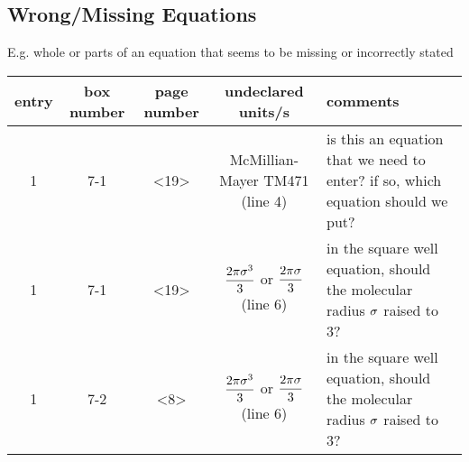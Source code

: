 \subsection{Wrong/Missing Equations}

E.g. whole or parts of an equation that seems to be missing or incorrectly stated \\ 

\begin{longtable} { | c | c | c | c | p{6cm} | } 
 \hline
    entry & box number & page number
    & undeclared units/s 
    & comments \\
 \hline
	1 & 7-1 & <19> & McMillian-Mayer TM471 (line 4) & is this an equation that we need to enter? if so, which equation should we put?  \\ \hline
	1 & 7-1 & <19> & $\dfrac{2\pie\molecrad^3}{3}$ or $\dfrac{2\pie\molecrad}{3}$ (line 6)& in the square well equation, should the molecular radius $\molecrad$ raised to 3? \\ \hline
    1 & 7-2 & <8> & $\dfrac{2\pie\molecrad^3}{3}$ or $\dfrac{2\pie\molecrad}{3}$ (line 6)& in the square well equation, should the molecular radius $\molecrad$ raised to 3? \\ \hline

\end{longtable}